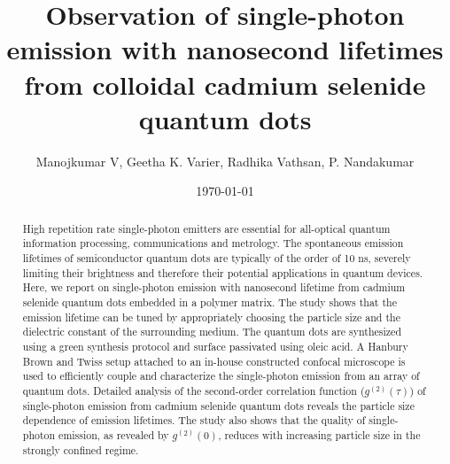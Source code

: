 \documentclass[%
 aip,
 amsmath,amssymb,
 reprint,%
]{revtex4-1}
\begin{document}

\title[Single-photon emission from CdSe quantum dots]{Observation of single-photon emission with nanosecond lifetimes from colloidal cadmium selenide quantum dots}

\author{Manojkumar V, Geetha K. Varier, Radhika Vathsan, P. Nandakumar}
 

\date{\today}

\begin{abstract}
High repetition rate single-photon emitters are essential for all-optical quantum information processing, communications and metrology. The spontaneous emission lifetimes of semiconductor quantum dots are typically of the order of 10 ns, severely limiting their brightness and therefore their potential applications in quantum devices.  Here, we report on single-photon emission with nanosecond lifetime from cadmium selenide quantum dots embedded in a polymer matrix. The study shows that the emission lifetime can be tuned by appropriately choosing the particle size and the dielectric constant of the surrounding medium. The quantum dots are synthesized using a green synthesis protocol and surface passivated using oleic acid. A Hanbury Brown and Twiss setup attached to an in-house constructed confocal microscope is used to efficiently couple and characterize the single-photon emission from an array of quantum dots.  Detailed analysis of the second-order correlation function ($g^{(2)}(\tau)$) of single-photon emission from cadmium selenide quantum dots reveals the particle size dependence of emission lifetimes. The study also shows that the quality of single-photon emission, as revealed by $g^{(2)}(0)$, reduces with increasing particle size in the strongly confined regime.
\end{abstract}

\maketitle
\end{document}
